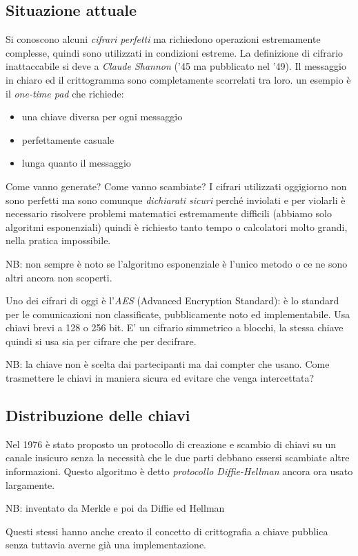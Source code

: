 \subsection{Situazione attuale}
Si conoscono alcuni \emph{cifrari perfetti} ma richiedono operazioni estremamente complesse, quindi sono utilizzati in condizioni estreme. La definizione di cifrario inattaccabile si deve a \emph{Claude Shannon} ('45 ma pubblicato nel '49). Il messaggio in chiaro ed il crittogramma sono completamente scorrelati tra loro. un esempio è il \emph{one-time pad} che richiede:
\begin{itemize}
    \item una chiave diversa per ogni messaggio
    \item perfettamente casuale
    \item lunga quanto il messaggio
\end{itemize}
Come vanno generate? Come vanno scambiate?
I cifrari utilizzati oggigiorno non sono perfetti ma sono comunque \emph{dichiarati sicuri} perché inviolati e per violarli è necessario risolvere problemi matematici estremamente difficili (abbiamo solo algoritmi esponenziali) quindi è richiesto tanto tempo o calcolatori molto grandi, nella pratica impossibile.

NB: non sempre è noto se l'algoritmo esponenziale è l'unico metodo o ce ne sono altri ancora non scoperti.

Uno dei cifrari di oggi è l'\emph{AES} (Advanced Encryption Standard): è lo standard per le comunicazioni non classificate, pubblicamente noto ed implementabile. Usa chiavi brevi a 128 o 256 bit. E' un cifrario simmetrico a blocchi, la stessa chiave quindi si usa sia per cifrare che per decifrare.

NB: la chiave non è scelta dai partecipanti ma dai compter che usano.
Come trasmettere le chiavi in maniera sicura ed evitare che venga intercettata?

\subsection{Distribuzione delle chiavi}
Nel 1976 è stato proposto un protocollo di creazione e scambio di chiavi su un canale insicuro senza la necessità che le due parti debbano essersi scambiate altre informazioni. Questo algoritmo è detto \emph{protocollo Diffie-Hellman} ancora ora usato largamente.

NB: inventato da Merkle e poi da Diffie ed Hellman

Questi stessi hanno anche creato il concetto di crittografia a chiave pubblica senza tuttavia averne già una implementazione.

